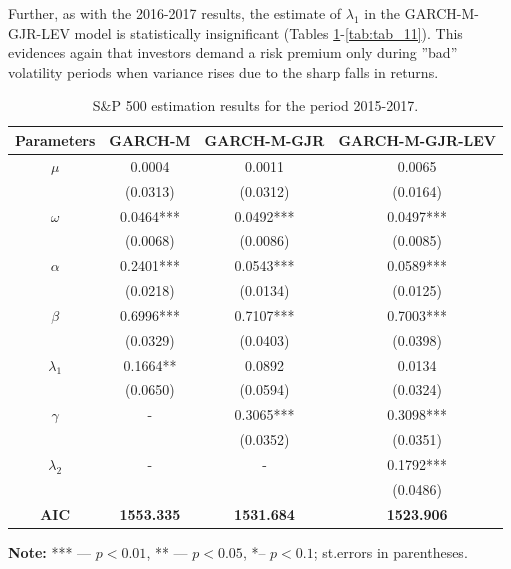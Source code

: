 \documentclass[authoryear, 1p]{elsarticle}
\numberwithin{equation}{section}
\begin{document}
Further, as with the 2016-2017 results, the estimate of $\lambda_{1}$ in the GARCH-M-GJR-LEV model is statistically insignificant (Tables \ref{tab:tab_9}-\ref{tab:tab_11}). This evidences again that investors demand a risk premium only during ''bad'' volatility periods when variance rises due to the sharp falls in returns.

\begin{table}[h!]
\begin{center}
\caption{S\&P 500 estimation results for the period 2015-2017.}
\label{tab:tab_9}
\begin{tabular*}{\textwidth}{cccc}
\hline
\hline
\textbf{Parameters} & \textbf{GARCH-M}  & \textbf{GARCH-M-GJR} & \textbf{GARCH-M-GJR-LEV} \\
\hline
\hline
$\mu$                  & 0.0004            & 0.0011               & 0.0065                   \\
                    & (0.0313)          & (0.0312)             & (0.0164)                 \\
$\omega$               & 0.0464***         & 0.0492***            & 0.0497***                \\
                    & (0.0068)          & (0.0086)             & (0.0085)                 \\
$\alpha$               & 0.2401***         & 0.0543***            & 0.0589***                \\
                    & (0.0218)          & (0.0134)             & (0.0125)                 \\
$\beta$                & 0.6996***         & 0.7107***            & 0.7003***                \\
                    & (0.0329)          & (0.0403)             & (0.0398)                 \\
$\lambda_{1}$              & 0.1664**          & 0.0892               & 0.0134                   \\
                    & (0.0650)          & (0.0594)             & (0.0324)                 \\
$\gamma$               & -                 & 0.3065***            & 0.3098***                \\
                    &                   & (0.0352)             & (0.0351)                 \\
$\lambda_{2}$           & -                 & -                    & 0.1792***                \\
                    &                   &                      & (0.0486)                 \\
\hline
\textbf{AIC}        & \textbf{1553.335} & \textbf{1531.684}    & \textbf{1523.906}        \\
\hline
\hline
\end{tabular*}
\end{center}
\footnotesize
\renewcommand{\baselineskip}{11pt}
\textbf{Note:} *** —  $p<0.01$, ** —  $p < 0.05$, *– $p < 0.1$; st.errors in parentheses.
\end{table}
\end{document}
